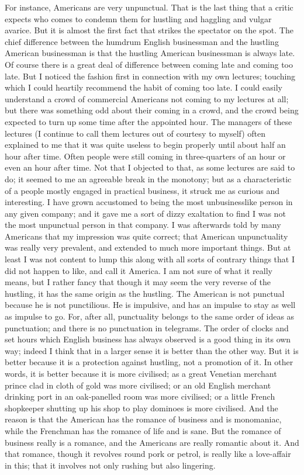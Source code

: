 \documentclass{book}
\begin{document}
For instance, Americans are very unpunctual. That is the last thing that a critic expects who comes to condemn them for hustling and haggling and vulgar avarice. But it is almost the first fact that strikes the spectator on the spot. The chief difference between the humdrum English businessman and the hustling American businessman is that the hustling American businessman is always late. Of course there is a great deal of difference between coming late and coming too late. But I noticed the fashion first in connection with my own lectures; touching which I could heartily recommend the habit of coming too late. I could easily understand a crowd of commercial Americans not coming to my lectures at all; but there was something odd about their coming in a crowd, and the crowd being expected to turn up some time after the appointed hour. The managers of these lectures (I continue to call them lectures out of courtesy to myself) often explained to me that it was quite useless to begin properly until about half an hour after time. Often people were still coming in three-quarters of an hour or even an hour after time. Not that I objected to that, as some lectures are said to do; it seemed to me an agreeable break in the monotony; but as a characteristic of a people mostly engaged in practical business, it struck me as curious and interesting. I have grown accustomed to being the most unbusinesslike person in any given company; and it gave me a sort of dizzy exaltation to find I was not the most unpunctual person in that company. I was afterwards told by many Americans that my impression was quite correct; that American unpunctuality was really very prevalent, and extended to much more important things. But at least I was not content to lump this along with all sorts of contrary things that I did not happen to like, and call it America. I am not sure of what it really means, but I rather fancy that though it may seem the very reverse of the hustling, it has the same origin as the hustling. The American is not punctual because he is not punctilious. He is impulsive, and has an impulse to stay as well as impulse to go. For, after all, punctuality belongs to the same order of ideas as punctuation; and there is no punctuation in telegrams. The order of clocks and set hours which English business has always observed is a good thing in its own way; indeed I think that in a larger sense it is better than the other way. But it is better because it is a protection against hustling, not a promotion of it. In other words, it is better because it is more civilised; as a great Venetian merchant prince clad in cloth of gold was more civilised; or an old English merchant drinking port in an oak-panelled room was more civilised; or a little French shopkeeper shutting up his shop to play dominoes is more civilised. And the reason is that the American has the romance of business and is monomaniac, while the Frenchman has the romance of life and is sane. But the romance of business really is a romance, and the Americans are really romantic about it. And that romance, though it revolves round pork or petrol, is really like a love-affair in this; that it involves not only rushing but also lingering.
\end{document}
